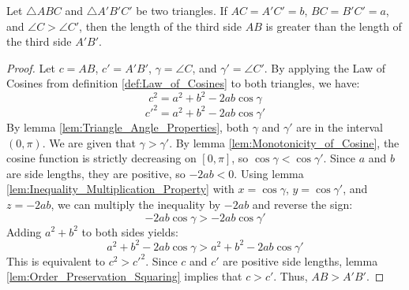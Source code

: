 \begin{theorem}
    \label{thm:Hinge_Theorem}
    Let $\triangle ABC$ and $\triangle A'B'C'$ be two triangles. If $AC = A'C' = b$, $BC = B'C' = a$, and $\angle C > \angle C'$, then the length of the third side $AB$ is greater than the length of the third side $A'B'$.
\end{theorem}

\begin{proof}
    Let $c = AB$, $c' = A'B'$, $\gamma = \angle C$, and $\gamma' = \angle C'$. By applying the Law of Cosines from definition \ref{def:Law_of_Cosines} to both triangles, we have:
    $$c^2 = a^2 + b^2 - 2ab \cos \gamma$$
    $$c'^2 = a^2 + b^2 - 2ab \cos \gamma'$$
    By lemma \ref{lem:Triangle_Angle_Properties}, both $\gamma$ and $\gamma'$ are in the interval $(0, \pi)$. We are given that $\gamma > \gamma'$. By lemma \ref{lem:Monotonicity_of_Cosine}, the cosine function is strictly decreasing on $[0, \pi]$, so $\cos \gamma < \cos \gamma'$.
    Since $a$ and $b$ are side lengths, they are positive, so $-2ab < 0$. Using lemma \ref{lem:Inequality_Multiplication_Property} with $x = \cos \gamma$, $y = \cos \gamma'$, and $z = -2ab$, we can multiply the inequality by $-2ab$ and reverse the sign:
    $$-2ab \cos \gamma > -2ab \cos \gamma'$$
    Adding $a^2 + b^2$ to both sides yields:
    $$a^2 + b^2 - 2ab \cos \gamma > a^2 + b^2 - 2ab \cos \gamma'$$
    This is equivalent to $c^2 > c'^2$. Since $c$ and $c'$ are positive side lengths, lemma \ref{lem:Order_Preservation_Squaring} implies that $c > c'$. Thus, $AB > A'B'$.
\end{proof}